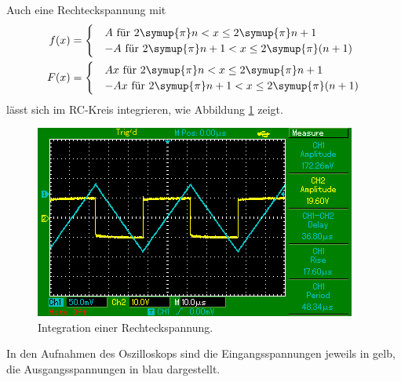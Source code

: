 Auch eine Rechteckspannung mit
\begin{align*}
  f(x) &= \begin{cases} &A \text{  für } 2\symup{\pi} n < x \leq 2\symup{\pi} n + 1 \\
                        &-A \text{  für } 2\symup{\pi} n + 1 < x \leq 2\symup{\pi} (n+1) \end{cases} \\
  F(x) &= \begin{cases} &Ax \text{  für } 2\symup{\pi} n < x \leq 2\symup{\pi} n + 1 \\
                        &-Ax \text{  für } 2\symup{\pi} n + 1 < x \leq 2\symup{\pi} (n+1) \end{cases}
\end{align*}
lässt sich im RC-Kreis integrieren, wie Abbildung \ref{fig:oszi4} zeigt.
\begin{figure}[H]
  \centering
  \includegraphics{bilder/MAP006.png}
  \caption{Integration einer Rechteckspannung.}
  \label{fig:oszi4}
\end{figure}

In den Aufnahmen des Oszilloskops sind die Eingangsspannungen jeweils in gelb, die Ausgangsspannungen in blau dargestellt.\newpage
